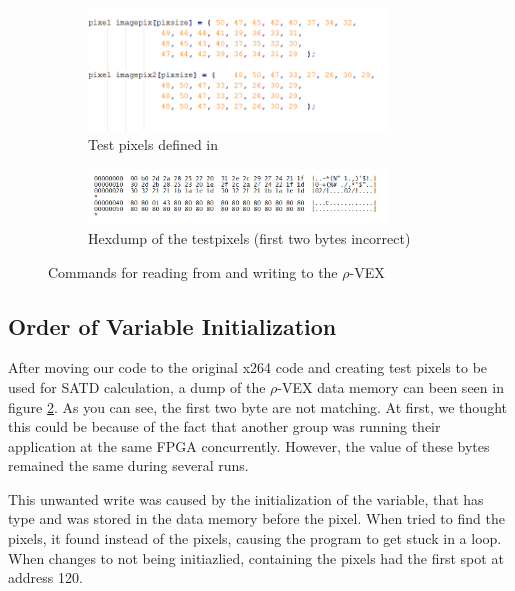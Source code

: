\begin{figure}
	\centering
	\begin{subfigure} [h] {0.5\textwidth}
		\centering
		\includegraphics[width=300px]{Pictures/testpixels}
		\caption{Test pixels defined in }
		\label{fig:test}
	\end{subfigure}
	\quad
	\begin{subfigure} [h] {0.5\textwidth}
		\centering
		\includegraphics[width=300px]{Pictures/hextest}
		\caption{Hexdump of the testpixels (first two bytes incorrect)}
		\label{fig:testhex}
	\end{subfigure}
	\quad
\caption{Commands for reading from and writing to the $\rho$-VEX}%
\label{}%
\end{figure}


\subsection{Order of Variable Initialization}
After moving our code to the original x264 code and creating test pixels to be used for SATD calculation, a dump of the $\rho$-VEX data memory can been seen in figure \ref{fig:testhex}. As you can see, the first two byte are not matching. At first, we thought this could be because of the fact that another group was running their application at the same FPGA concurrently. However, the value of these bytes remained the same during several runs. 

This unwanted write was caused by the initialization of the  variable, that has type  and was stored in the data memory before the pixel. When  tried to find the pixels, it found  instead of the pixels, causing the program to get stuck in a loop. When changes  to not being initiazlied,  containing the pixels had the first spot at address 120.

